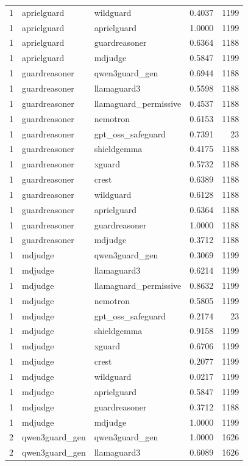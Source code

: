 \begin{tabular}{rllrr}
1 & aprielguard & wildguard & 0.4037 & 1199 \\
1 & aprielguard & aprielguard & 1.0000 & 1199 \\
1 & aprielguard & guardreasoner & 0.6364 & 1188 \\
1 & aprielguard & mdjudge & 0.5847 & 1199 \\
1 & guardreasoner & qwen3guard\_gen & 0.6944 & 1188 \\
1 & guardreasoner & llamaguard3 & 0.5598 & 1188 \\
1 & guardreasoner & llamaguard\_permissive & 0.4537 & 1188 \\
1 & guardreasoner & nemotron & 0.6153 & 1188 \\
1 & guardreasoner & gpt\_oss\_safeguard & 0.7391 & 23 \\
1 & guardreasoner & shieldgemma & 0.4175 & 1188 \\
1 & guardreasoner & xguard & 0.5732 & 1188 \\
1 & guardreasoner & crest & 0.6389 & 1188 \\
1 & guardreasoner & wildguard & 0.6128 & 1188 \\
1 & guardreasoner & aprielguard & 0.6364 & 1188 \\
1 & guardreasoner & guardreasoner & 1.0000 & 1188 \\
1 & guardreasoner & mdjudge & 0.3712 & 1188 \\
1 & mdjudge & qwen3guard\_gen & 0.3069 & 1199 \\
1 & mdjudge & llamaguard3 & 0.6214 & 1199 \\
1 & mdjudge & llamaguard\_permissive & 0.8632 & 1199 \\
1 & mdjudge & nemotron & 0.5805 & 1199 \\
1 & mdjudge & gpt\_oss\_safeguard & 0.2174 & 23 \\
1 & mdjudge & shieldgemma & 0.9158 & 1199 \\
1 & mdjudge & xguard & 0.6706 & 1199 \\
1 & mdjudge & crest & 0.2077 & 1199 \\
1 & mdjudge & wildguard & 0.0217 & 1199 \\
1 & mdjudge & aprielguard & 0.5847 & 1199 \\
1 & mdjudge & guardreasoner & 0.3712 & 1188 \\
1 & mdjudge & mdjudge & 1.0000 & 1199 \\
2 & qwen3guard\_gen & qwen3guard\_gen & 1.0000 & 1626 \\
2 & qwen3guard\_gen & llamaguard3 & 0.6089 & 1626 \\

\end{tabular}

